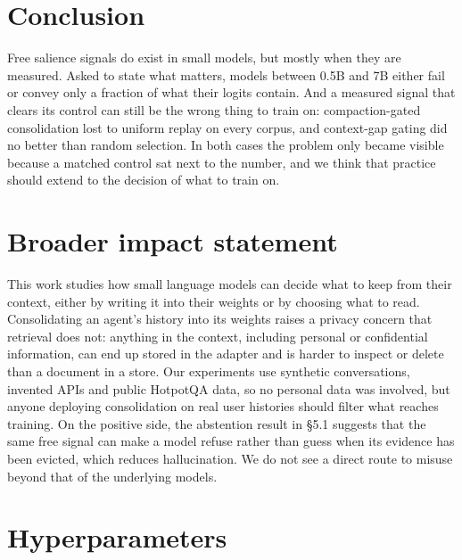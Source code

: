 \documentclass[10pt]{article}
\begin{document}
\section{Conclusion}

Free salience signals do exist in small models, but mostly when they are measured. Asked to
state what matters, models between 0.5B and 7B either fail or convey only a fraction of what
their logits contain. And a measured signal that clears its control can still be the wrong
thing to train on: compaction-gated consolidation lost to uniform replay on every corpus, and
context-gap gating did no better than random selection. In both cases the problem only
became visible because a matched control sat next to the number, and we think that practice
should extend to the decision of what to train on.

\section{Broader impact statement}

This work studies how small language models can decide what to keep from their context,
either by writing it into their weights or by choosing what to read. Consolidating an agent's
history into its weights raises a privacy concern that retrieval does not: anything in the
context, including personal or confidential information, can end up stored in the adapter
and is harder to inspect or delete than a document in a store. Our experiments use synthetic
conversations, invented APIs and public HotpotQA data, so no personal data was involved, but
anyone deploying consolidation on real user histories should filter what reaches training.
On the positive side, the abstention result in §5.1 suggests that the same free signal can
make a model refuse rather than guess when its evidence has been evicted, which reduces
hallucination. We do not see a direct route to misuse beyond that of the underlying models.




\newpage
\appendix

\section{Hyperparameters}
\end{document}
